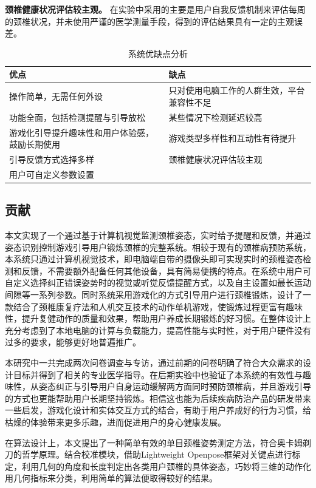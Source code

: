 \documentclass[12pt,a4paper]{article}%
\begin{document}
\textbf{颈椎健康状况评估较主观。}
在实验中采用的主要是用户自我反馈机制来评估每周的颈椎状况，并未使用严谨的医学测量手段，得到的评估结果具有一定的主观误差。
\begin{table}[!htbp]
\center
\caption{系统优缺点分析}
\begin{tabularx}{\textwidth}{X|X} \hline
	优点 & 缺点  \\ \hline
	操作简单，无需任何外设 & 只对使用电脑工作的人群生效，平台兼容性不足\\ \hline
	功能全面，包括检测提醒与引导放松&某些情况下检测延迟较高\\ \hline
	游戏化引导提升趣味性和用户体验感，鼓励长期使用 & 游戏类型多样性和互动性有待提升\\ \hline
	引导反馈方式选择多样 & 颈椎健康状况评估较主观\\ \hline
	用户可自定义参数设置 & \\ \hline
\end{tabularx}
\end{table}
\subsection{贡献}
本文实现了一个通过基于计算机视觉监测颈椎姿态，实时给予提醒和反馈，并通过姿态识别控制游戏引导用户锻炼颈椎的完整系统。相较于现有的颈椎病预防系统，本系统只通过计算机视觉技术，即电脑端自带的摄像头即可实现实时的颈椎姿态检测和反馈，不需要额外配备任何其他设备，具有简易便携的特点。在系统中用户可自定义选择纠正错误姿势时的视觉或听觉反馈提醒方式，以及自主设置如最长运动间隙等一系列参数。同时系统采用游戏化的方式引导用户进行颈椎锻炼，设计了一款结合了颈椎康复疗法和人机交互技术的动作单机游戏，使锻炼过程更富有趣味性，提升复健动作的质量和效果，帮助用户养成长期锻炼的好习惯。在整体设计上充分考虑到了本地电脑的计算与负载能力，提高性能与实时性，对于用户硬件没有过多的要求，能够更好地普遍推广。


本研究中一共完成两次问卷调查与专访，通过前期的问卷明确了符合大众需求的设计目标并得到了相关的专业医学指导。在后期实验中也验证了本系统的有效性与趣味性，从姿态纠正与引导用户自身运动缓解两方面同时预防颈椎病，并且游戏引导的方式也更能帮助用户长期坚持锻炼。相信这也能为后续疾病防治产品的研发带来一些启发，游戏化设计和实体交互方式的结合，有助于用户养成好的行为习惯，给枯燥的体验带来更多乐趣，进而促进用户的身心健康发展。


在算法设计上，本文提出了一种简单有效的单目颈椎姿势测定方法，符合奥卡姆剃刀的哲学原理。结合校准模块，借助Lightweight Openpose框架\cite{lw_openpose}对关键点进行标定，利用几何的角度和长度判定出各类用户颈椎的具体姿态，巧妙将三维的动作化用几何指标来分类，利用简单的算法便取得较好的结果。
\end{document}

